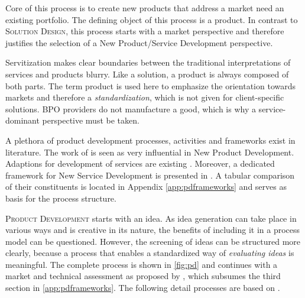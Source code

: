 	Core of this process is to create new products that address a market need \wrt an existing portfolio. The defining object of this process is a product. In contrast to \textsc{Solution Design}, this process starts with a market perspective and therefore justifies the selection of a New Product/Service Development perspective.  
	
	Servitization makes clear boundaries between the traditional interpretations of services and products blurry. Like a solution, a product is always composed of both parts. The term product is used here to emphasize the orientation towards markets and therefore a \textit{standardization}, which is not given for client-specific solutions. \acrshort{BPO} providers do not manufacture a good, which is why a service-dominant perspective must be taken.  
	
	A plethora of product development processes, activities and frameworks exist in literature. The work of  \cite{cooper1988new} is seen as very influential in New Product Development. Adaptions for development of services are existing \citep{Edgett_1996}. Moreover, a dedicated framework for New Service Development is presented in \citep{cowell1988new}. A tabular comparison of their constituents is located in Appendix \ref{app:pdframeworks} and serves as basis for the process structure. 
	
	 \textsc{Product Development} starts with an idea. As idea generation can take place in various ways and is creative in its nature, the benefits of including it in a process model can be questioned. However, the screening of ideas can be structured more clearly, because a process that enables a standardized way of \textit{evaluating ideas} is meaningful. The complete process is shown in \Fig \ref{fig:pd} and continues with a market and technical assessment as proposed by \citep{Edgett_1996}, which subsumes the third section in \ref{app:pdframeworks}. The following detail processes are based on \citep{cowell1988new}. 
	
